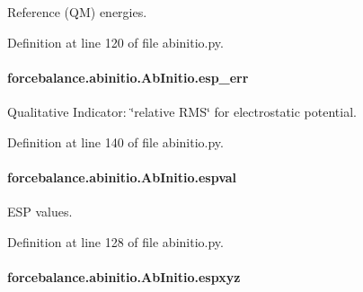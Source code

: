 Reference (Q\-M) energies. 



Definition at line 120 of file abinitio.\-py.

\hypertarget{classforcebalance_1_1abinitio_1_1AbInitio_abdc625c3149cee375b56b4e0d73034fe}{
\paragraph[{esp\-\_\-err}]{\setlength{\rightskip}{0pt plus 5cm}forcebalance.\-abinitio.\-Ab\-Initio.\-esp\-\_\-err\hspace{0.3cm}{\ttfamily [inherited]}}}\label{classforcebalance_1_1abinitio_1_1AbInitio_abdc625c3149cee375b56b4e0d73034fe}


Qualitative Indicator\-: \char`\"{}relative R\-M\-S\char`\"{} for electrostatic potential. 



Definition at line 140 of file abinitio.\-py.

\hypertarget{classforcebalance_1_1abinitio_1_1AbInitio_aba6d885086d455fce8c3d472fd08020d}{
\paragraph[{espval}]{\setlength{\rightskip}{0pt plus 5cm}forcebalance.\-abinitio.\-Ab\-Initio.\-espval\hspace{0.3cm}{\ttfamily [inherited]}}}\label{classforcebalance_1_1abinitio_1_1AbInitio_aba6d885086d455fce8c3d472fd08020d}


E\-S\-P values. 



Definition at line 128 of file abinitio.\-py.

\hypertarget{classforcebalance_1_1abinitio_1_1AbInitio_a8be2d088afb344036aae989ca3cbcc41}{
\paragraph[{espxyz}]{\setlength{\rightskip}{0pt plus 5cm}forcebalance.\-abinitio.\-Ab\-Initio.\-espxyz\hspace{0.3cm}{\ttfamily [inherited]}}}\label{classforcebalance_1_1abinitio_1_1AbInitio_a8be2d088afb344036aae989ca3cbcc41}


